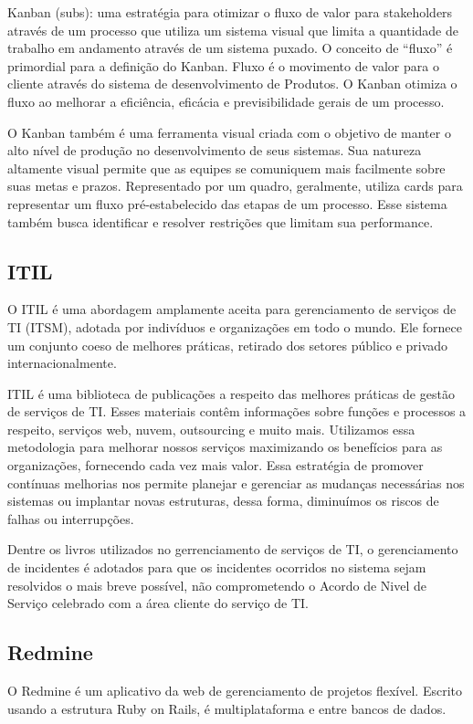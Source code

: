 Kanban (subs):  uma estratégia para otimizar o fluxo de valor para stakeholders através de um processo que utiliza um sistema visual que limita a quantidade de trabalho em andamento através de um sistema puxado. O conceito de “fluxo” é primordial para a definição do Kanban. Fluxo é o movimento de valor para o  cliente  através  do  sistema  de  desenvolvimento  de  Produtos.  O  Kanban  otimiza  o  fluxo  ao melhorar a eficiência, eficácia e previsibilidade gerais de um processo.\cite{Kanban}

O Kanban também é uma ferramenta visual criada com o objetivo de manter o alto nível de produção no desenvolvimento de seus sistemas. Sua natureza altamente visual permite que as equipes se comuniquem mais facilmente sobre suas metas e prazos. Representado por um quadro, geralmente, utiliza cards para representar um fluxo pré-estabelecido das etapas de um processo. Esse sistema também busca identificar e resolver restrições que limitam sua performance.

\subsection{ITIL}

O ITIL é uma abordagem amplamente aceita para gerenciamento de serviços de TI (ITSM), adotada por indivíduos e organizações em todo o mundo. Ele fornece um conjunto coeso de melhores práticas, retirado dos setores público e privado internacionalmente.\cite{ITILLivroAXELOS}\cite{ITIL}

ITIL é uma biblioteca de publicações a respeito das melhores práticas de gestão de serviços de TI. Esses materiais contêm informações sobre funções e processos a respeito, serviços web, nuvem, outsourcing e muito mais. Utilizamos essa metodologia para melhorar nossos serviços maximizando os benefícios para as organizações, fornecendo cada vez mais valor. Essa estratégia de promover contínuas melhorias nos permite planejar e gerenciar as mudanças necessárias nos sistemas ou implantar novas estruturas, dessa forma, diminuímos os riscos de falhas ou interrupções.

Dentre os livros utilizados no gerrenciamento de serviços de TI, o gerenciamento de incidentes é adotados para que os incidentes ocorridos no sistema sejam resolvidos o mais breve possível, não comprometendo o Acordo de Nivel de Serviço celebrado com a área cliente do serviço de TI. \cite{ITILLivro}

\subsection{Redmine}
O Redmine é um aplicativo da web de gerenciamento de projetos flexível. Escrito usando a estrutura Ruby on Rails, é multiplataforma e entre bancos de dados.\cite{Remine}






